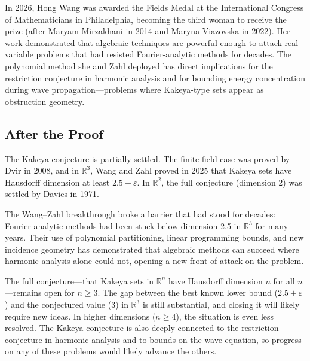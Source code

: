 In 2026, Hong Wang was awarded the Fields Medal at the International Congress of Mathematicians in Philadelphia, becoming the third woman to receive the prize (after Maryam Mirzakhani in 2014 and Maryna Viazovska in 2022). Her work demonstrated that algebraic techniques are powerful enough to attack real-variable problems that had resisted Fourier-analytic methods for decades. The polynomial method she and Zahl deployed has direct implications for the restriction conjecture in harmonic analysis and for bounding energy concentration during wave propagation---problems where Kakeya-type sets appear as obstruction geometry.

\subsection{After the Proof}

The Kakeya conjecture is partially settled. The finite field case was proved by Dvir in 2008, and in $\mathbb{R}^3$, Wang and Zahl proved in 2025 that Kakeya sets have Hausdorff dimension at least $2.5 + \varepsilon$. In $\mathbb{R}^2$, the full conjecture (dimension 2) was settled by Davies in 1971.

The Wang--Zahl breakthrough broke a barrier that had stood for decades: Fourier-analytic methods had been stuck below dimension 2.5 in $\mathbb{R}^3$ for many years. Their use of polynomial partitioning, linear programming bounds, and new incidence geometry has demonstrated that algebraic methods can succeed where harmonic analysis alone could not, opening a new front of attack on the problem.

The full conjecture---that Kakeya sets in $\mathbb{R}^n$ have Hausdorff dimension $n$ for all $n$---remains open for $n \geq 3$. The gap between the best known lower bound ($2.5 + \varepsilon$) and the conjectured value (3) in $\mathbb{R}^3$ is still substantial, and closing it will likely require new ideas. In higher dimensions ($n \geq 4$), the situation is even less resolved. The Kakeya conjecture is also deeply connected to the restriction conjecture in harmonic analysis and to bounds on the wave equation, so progress on any of these problems would likely advance the others.

